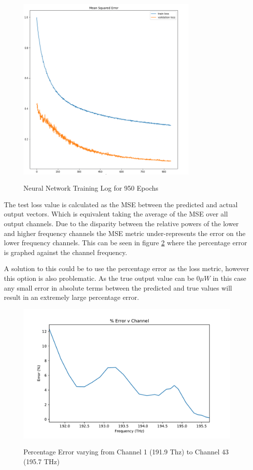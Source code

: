 \begin{figure}[!h]
    \centering
    \caption{Neural Network Training Log for 950 Epochs}
    \includegraphics[width = 0.8\textwidth]{project/img/ml_model/combined_model_training_log.png}
    \label{fig:ml_model:nn_training}
\end{figure}


The test loss value is calculated as the MSE between the predicted and actual output vectors. Which is equivalent taking the average of the MSE over all output channels. Due to the disparity between the relative powers of the lower and higher frequency channels the MSE metric under-represents the error on the lower frequency channels. This can be seen in figure \ref{fig:ml_model:pct_err_freq} where the percentage error is graphed against the channel frequency.

A solution to this could be to use the percentage error as the loss metric, however this option is also problematic. As the true output value can be $0\mu W$ in this case any small error in absolute terms between the predicted and true values will result in an extremely large percentage error.

\begin{figure}[!h]
    \centering
    \caption{Percentage Error varying from Channel 1 (191.9 Thz) to Channel 43 (195.7 THz)}
    \includegraphics[width = \textwidth]{project/img/ml_model/pct_err_freq.pdf}
    \label{fig:ml_model:pct_err_freq}
\end{figure}

